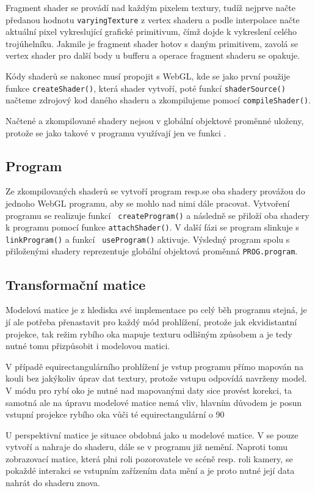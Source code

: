 Fragment shader se provádí nad každým pixelem textury, tudíž nejprve načte předanou hodnotu \texttt{varyingTexture} z vertex shaderu a podle interpolace načte aktuální pixel vykreslující grafické primitivum, čímž dojde k vykreslení celého trojúhelníku. Jakmile je fragment shader hotov s daným primitivem, zavolá se vertex shader pro další body u bufferu a operace fragment shaderu se opakuje.

Kódy shaderů se nakonec musí propojit s WebGL, kde se jako první použije funkce \texttt{createShader()}, která shader vytvoří, poté funkcí \texttt{shaderSource()} načteme zdrojový kod daného shaderu a zkompilujeme pomocí \texttt{compileShader()}.

Načtené a zkompilované shadery nejsou v globální objektové proměnné uloženy, protože se jako takové v programu využívají jen ve funkci \texttt{\setupProgram}.

\subsection{Program}
Ze zkompilovaných shaderů se vytvoří program resp.se oba shadery provážou  do jednoho WebGL programu, aby se mohlo nad nimi dále pracovat. Vytvoření programu se realizuje funkcí \texttt{ createProgram()} a následně se přiloží oba shadery k programu pomocí funkce \texttt{attachShader()}. V další fázi se program slinkuje s \texttt{linkProgram()} a funkcí \texttt{ useProgram()} aktivuje. Výsledný program spolu s přiloženými shadery reprezentuje globální objektová proměnná \texttt{PROG.program}.


\subsection{Transformační matice}
Modelová matice je z hlediska své implementace po celý běh programu stejná, je jí ale potřeba přenastavit pro každý mód prohlížení, protože jak ekvidistantní projekce, tak režim rybího oka mapuje texturu odlišným způsobem a je tedy nutné tomu přizpůsobit i modelovou matici.

V případě equirectangulárního prohlížení je vstup programu přímo mapován na kouli bez jakýkoliv úprav dat textury, protože vstupu odpovídá navrženy model. V módu pro rybí oko je nutné nad mapovanými daty sice provést korekci, ta samotná  ale na úpravu modelové matice nemá vliv, hlavním důvodem je posun vstupní projekce rybího oka vůči té equirectangulární o 90\degree

U perspektivní matice je situace obdobná jako u modelové matice. V \texttt{\setupProgram} se pouze vytvoří a nahraje do shaderu, dále se v programu již nemění. Naproti tomu zobrazovací matice, která plni roli pozorovatele ve scéně resp. roli kamery, se pokaždé interakci se vstupním zařízením data mění a je proto nutné její data nahrát do shaderu znova. 


